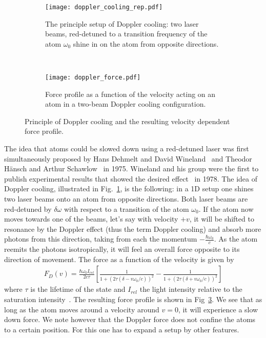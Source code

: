 \begin{figure}[t]
  \centering
  \begin{subfigure}[t]{0.48\linewidth} 
    \centering
    \texttt{[image: doppler\_cooling\_rep.pdf]}
    \caption{The principle setup of Doppler cooling: two laser beams, red-detuned to a
    transition frequency of the atom $\omega_0$ shine in on the atom from opposite
  directions.}
    \label{fig:doppler_cooling}
  \end{subfigure}
  ~
  \begin{subfigure}[t]{0.48\linewidth} 
    \centering
    \texttt{[image: doppler\_force.pdf]}
    \caption{Force profile as a function of the velocity acting on an atom in a
    two-beam Doppler cooling configuration.}
    \label{fig:doppler_force}
  \end{subfigure}
  \caption{Principle of Doppler cooling and the resulting velocity dependent
  force profile.}
\end{figure}

The idea that atoms could be slowed down using a red-detuned laser was first
simultaneously proposed by Hans Dehmelt and David
Wineland~\cite{wineland1975bullamphys} and Theodor Hänsch and Arthur
Schawlow~\cite{hansch1975cooling} in 1975. Wineland and his group were the first
to publish experimental results that showed the desired
effect~\cite{wineland1978radiation} in 1978. The idea of Doppler cooling,
illustrated in Fig.~\ref{fig:doppler_cooling}, is the following: in a 1D setup
one shines two laser beams onto an atom from opposite directions. Both laser
beams are red-detuned by $\delta\omega$ with respect to a transition of the atom
$\omega_0$. If the atom now moves towards one of the beams, let's say with
velocity $+v$, it will be shifted
to resonance by the Doppler effect (thus the term Doppler cooling) and absorb
more photons from this direction, taking from each the momentum
$-\frac{\hbar\omega_0}{c}$. As the atom reemits the photons isotropically,
it will feel an overall force opposite to its direction of movement.
The force as a function of the velocity is given by
\begin{align}
  \label{eq:doppler_force}
  F_D(v) = \frac{\hbar \omega_0 I_{rel}}{2c\tau}\left[
  \frac{1}{1+\left(2\tau(\delta-v\omega_0/c)\right)^2}
-\frac{1}{1+\left(2\tau(\delta+v\omega_0/c)\right)^2}\right]
\end{align}
where $\tau$ is the lifetime of the state and $I_{rel}$ the light intensity
relative to the saturation intensity~\cite{mudrich2015}. The resulting force
profile is shown in Fig~\ref{fig:doppler_force}. We see that as long as the atom
moves around a velocity around $v=0$, it will experience a slow down force. We
note however that the Doppler force does not confine the atoms to a certain
position. For this one has to expand a setup by other features.

